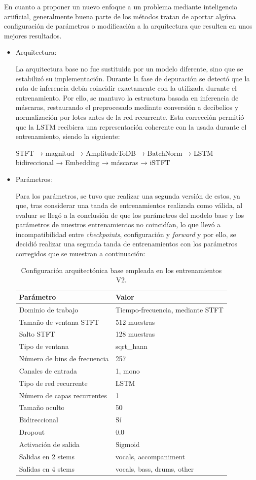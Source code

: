 En cuanto a proponer un nuevo enfoque a un problema mediante inteligencia artificial, generalmente buena parte de los métodos tratan de aportar algúna configuración de parámetros o modificación a la arquitectura que resulten en unos mejores resultados.
\begin{itemize}
    \item Arquitectura:
    
    La arquitectura base no fue sustituida por un modelo diferente, sino que se estabilizó su implementación. Durante la fase de depuración se detectó que la ruta de inferencia debía coincidir exactamente con la utilizada durante el entrenamiento. Por ello, se mantuvo la estructura basada en inferencia de máscaras, restaurando el preprocesado mediante conversión a decibelios y normalización por lotes antes de la red recurrente. Esta corrección permitió que la LSTM recibiera una representación coherente con la usada durante el entrenamiento, siendo la siguiente:

    STFT → magnitud → AmplitudeToDB → BatchNorm → LSTM bidireccional → Embedding → máscaras → iSTFT

    \item Parámetros:
    
    Para los parámetros, se tuvo que realizar una segunda versión de estos, ya que, tras considerar una tanda de entrenamientos realizada como válida, al evaluar se llegó a la conclusión de que los parámetros del modelo base y los parámetros de nuestros entrenamientos no coincidían, lo que llevó a incompatibilidad entre \textit{checkpoints}, configuración y \textit{forward} y por ello, se decidió realizar una segunda tanda de entrenamientos con los parámetros corregidos que se muestran a continuación:
    \begin{table}[H]
    \centering
    \begin{tabular}{ll}
    \hline
    \textbf{Parámetro} & \textbf{Valor} \\
    \hline
    Dominio de trabajo & Tiempo-frecuencia, mediante STFT \\
    Tamaño de ventana STFT & 512 muestras \\
    Salto STFT & 128 muestras \\
    Tipo de ventana & sqrt\_hann \\
    Número de bins de frecuencia & 257 \\
    Canales de entrada & 1, mono \\
    Tipo de red recurrente & LSTM \\
    Número de capas recurrentes & 1 \\
    Tamaño oculto & 50 \\
    Bidireccional & Sí \\
    Dropout & 0.0 \\
    Activación de salida & Sigmoid \\
    Salidas en 2 stems & vocals, accompaniment \\
    Salidas en 4 stems & vocals, bass, drums, other \\
    \hline
    \end{tabular}
    \caption{Configuración arquitectónica base empleada en los entrenamientos V2.}
    \end{table}
\end{itemize}